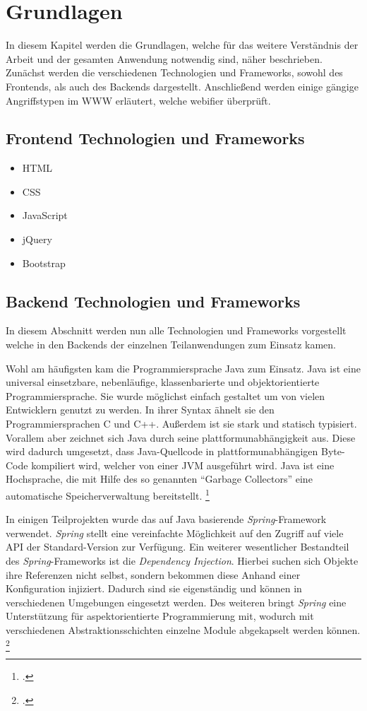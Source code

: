\chapter{Grundlagen}

In diesem Kapitel werden die Grundlagen, welche für das weitere Verständnis der Arbeit und der gesamten Anwendung notwendig sind, näher beschrieben. Zunächst werden die verschiedenen Technologien und Frameworks, sowohl des Frontends, als auch des Backends dargestellt. Anschließend werden einige gängige Angriffstypen im \ac{WWW} erläutert, welche webifier überprüft.

\section{Frontend Technologien und Frameworks}

\begin{itemize}
    \item HTML
    \item CSS
    \item JavaScript
    \item jQuery
    \item Bootstrap
\end{itemize}

\section{Backend Technologien und Frameworks}

In diesem Abschnitt werden nun alle Technologien und Frameworks vorgestellt welche in den Backends der einzelnen Teilanwendungen zum Einsatz kamen.

Wohl am häufigsten kam die Programmiersprache Java zum Einsatz. Java ist eine universal einsetzbare, nebenläufige, klassenbarierte und objektorientierte Programmiersprache. Sie wurde möglichst einfach gestaltet um von vielen Entwicklern genutzt zu werden. In ihrer Syntax ähnelt sie den Programmiersprachen C und C++. Außerdem ist sie stark und statisch typisiert. Vorallem aber zeichnet sich Java durch seine plattformunabhängigkeit aus. Diese wird dadurch umgesetzt, dass Java-Quellcode in plattformunabhängigen Byte-Code kompiliert wird, welcher von einer \ac{JVM} ausgeführt wird. Java ist eine Hochsprache, die mit Hilfe des so genannten \enquote{Garbage Collectors} eine automatische Speicherverwaltung bereitstellt. \footcite[Vgl.][1]{javaspecification}

In einigen Teilprojekten wurde das auf Java basierende \textit{Spring}-Framework verwendet. \textit{Spring} stellt eine vereinfachte Möglichkeit auf den Zugriff auf viele \ac{API} der Standard-Version zur Verfügung. Ein weiterer wesentlicher Bestandteil des \textit{Spring}-Frameworks ist die \textit{Dependency Injection}. Hierbei suchen sich Objekte ihre Referenzen nicht selbst, sondern bekommen diese Anhand einer Konfiguration injiziert. Dadurch sind sie eigenständig und können in verschiedenen Umgebungen eingesetzt werden. Des weiteren bringt \textit{Spring} eine Unterstützung für aspektorientierte Programmierung mit, wodurch mit verschiedenen Abstraktionsschichten einzelne Module abgekapselt werden können. \footcite[Vgl.][2]{spring3}

